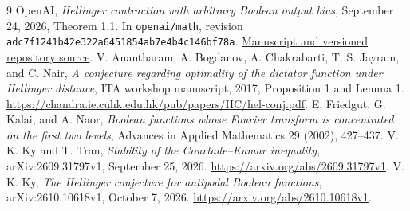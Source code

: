 \documentclass[11pt]{article}
\begin{document}
\begin{thebibliography}{9}
 OpenAI, \emph{Hellinger contraction with arbitrary Boolean
output bias}, September 24, 2026, Theorem 1.1. In \texttt{openai/math},
revision \texttt{adc7f1241b42e322a6451854ab7e4b4c146bf78a}.
\href{https://github.com/openai/math/blob/adc7f1241b42e322a6451854ab7e4b4c146bf78a/preprints/Hellinger-contraction-with-arbitrary-Boolean-output-bias-September-24-2026/main.pdf}{Manuscript and versioned repository source}.
 V. Anantharam, A. Bogdanov, A. Chakrabarti, T. S. Jayram,
and C. Nair, \emph{A conjecture regarding optimality of the dictator
function under Hellinger distance}, ITA workshop manuscript, 2017,
Proposition 1 and Lemma 1.
\url{https://chandra.ie.cuhk.edu.hk/pub/papers/HC/hel-conj.pdf}.
 E. Friedgut, G. Kalai, and A. Naor, \emph{Boolean functions
whose Fourier transform is concentrated on the first two levels},
Advances in Applied Mathematics 29 (2002), 427--437.
 V. K. Ky and T. Tran, \emph{Stability of the Courtade--Kumar
inequality}, arXiv:2609.31797v1, September 25, 2026.
\url{https://arxiv.org/abs/2609.31797v1}.
 V. K. Ky, \emph{The Hellinger conjecture for antipodal Boolean
functions}, arXiv:2610.10618v1, October 7, 2026.
\url{https://arxiv.org/abs/2610.10618v1}.
\end{thebibliography}
\end{document}
